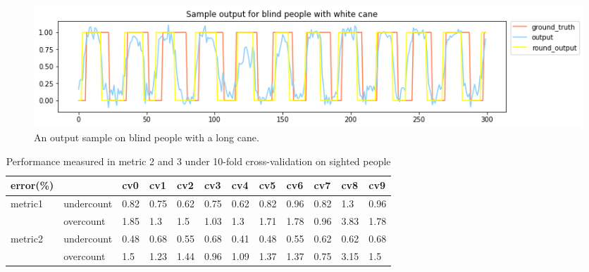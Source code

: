 \documentclass[11pt]{article}
\begin{document}
{\begin{figure}[ht]
\centering
\includegraphics[scale=0.5]{output_wc_2}
\caption{An output sample on blind people with a long cane.}
\label{fig:output_wc_2}
\end{figure}




\begin{table}[]
\centering
\caption{Performance measured in metric 2 and 3 under 10-fold cross-validation on sighted people}
\label{label_metric23_sighted}
\begin{tabular}{llllllllllll}
\hline
error(\%)                &            & cv0   & cv1   & cv2   & cv3   & cv4   & cv5   & cv6   & cv7   & cv8   & cv9  \\ \hline
metric1                  & undercount & 0.82  & 0.75  & 0.62  & 0.75  & 0.62  & 0.82  & 0.96  & 0.82  & 1.3   & 0.96 \\
                         & overcount  & 1.85  & 1.3   & 1.5   & 1.03  & 1.3   & 1.71  & 1.78  & 0.96  & 3.83  & 1.78 \\ \hline
\multirow{2}{*}{metric2} & undercount & 0.48  & 0.68  & 0.55  & 0.68  & 0.41  & 0.48  & 0.55  & 0.62  & 0.62  & 0.68 \\
                         & overcount  & 1.5   & 1.23  & 1.44  & 0.96  & 1.09  & 1.37  & 1.37  & 0.75  & 3.15  & 1.5  \\ \hline
\end{tabular}
\end{table}


}
\end{document}
